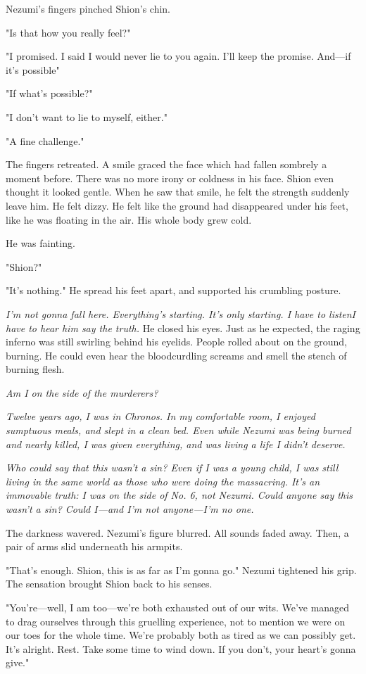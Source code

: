 Nezumi's fingers pinched Shion's chin.

"Is that how you really feel?"

"I promised. I said I would never lie to you again. I'll keep the
promise. And---if it's possible\el "

"If what's possible?"

"I don't want to lie to myself, either."

"A fine challenge."

The fingers retreated. A smile graced the face which had fallen sombrely
a moment before. There was no more irony or coldness in his face. Shion
even thought it looked gentle. When he saw that smile, he felt the
strength suddenly leave him. He felt dizzy. He felt like the ground had
disappeared under his feet, like he was floating in the air. His whole
body grew cold.

He was fainting.

"Shion?"

"It's nothing." He spread his feet apart, and supported his crumbling
posture.

\emph{I'm not gonna fall here. Everything's starting. It's only starting. I
have to listen\el I have to hear him say the truth.} He closed his eyes.
Just as he expected, the raging inferno was still swirling behind his
eyelids. People rolled about on the ground, burning. He could even hear
the bloodcurdling screams and smell the stench of burning flesh.

\emph{Am I on the side of the murderers?}

\emph{Twelve years ago, I was in Chronos. In my comfortable room, I enjoyed
sumptuous meals, and slept in a clean bed. Even while Nezumi was being
burned and nearly killed, I was given everything, and was living a life
I didn't deserve.}

\emph{Who could say that this wasn't a sin? Even if I was a young child, I was
still living in the same world as those who were doing the massacring.
It's an immovable truth: I was on the side of No. 6, not Nezumi. Could
anyone say this wasn't a sin? Could I---and I'm not anyone---I'm no one.}

The darkness wavered. Nezumi's figure blurred. All sounds faded away.
Then, a pair of arms slid underneath his armpits.

"That's enough. Shion, this is as far as I'm gonna go." Nezumi tightened
his grip. The sensation brought Shion back to his senses.

"You're---well, I am too---we're both exhausted out of our wits. We've
managed to drag ourselves through this gruelling experience, not to
mention we were on our toes for the whole time. We're probably both as
tired as we can possibly get. It's alright. Rest. Take some time to wind
down. If you don't, your heart's gonna give."

